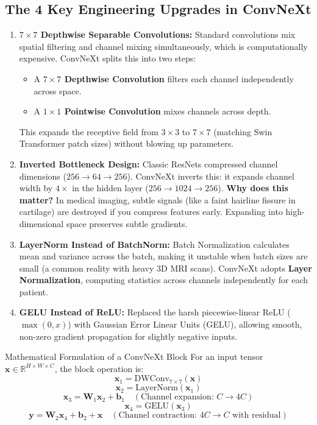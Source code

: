 \documentclass[11pt,a4paper]{article}
\begin{document}
\subsection{The 4 Key Engineering Upgrades in ConvNeXt}
\begin{enumerate}[leftmargin=*]
    \item \textbf{$7\times 7$ Depthwise Separable Convolutions:}
    Standard convolutions mix spatial filtering and channel mixing simultaneously, which is computationally expensive. ConvNeXt splits this into two steps:
    \begin{itemize}[noitemsep]
        \item A \textbf{$7\times 7$ Depthwise Convolution} filters each channel independently across space.
        \item A \textbf{$1\times 1$ Pointwise Convolution} mixes channels across depth.
    \end{itemize}
    This expands the receptive field from $3\times 3$ to $7\times 7$ (matching Swin Transformer patch sizes) without blowing up parameters.

    \item \textbf{Inverted Bottleneck Design:}
    Classic ResNets compressed channel dimensions ($256 \to 64 \to 256$). ConvNeXt inverts this: it expands channel width by $4\times$ in the hidden layer ($256 \to 1024 \to 256$). \textbf{Why does this matter?} In medical imaging, subtle signals (like a faint hairline fissure in cartilage) are destroyed if you compress features early. Expanding into high-dimensional space preserves subtle gradients.

    \item \textbf{LayerNorm Instead of BatchNorm:}
    Batch Normalization calculates mean and variance across the batch, making it unstable when batch sizes are small (a common reality with heavy 3D MRI scans). ConvNeXt adopts \textbf{Layer Normalization}, computing statistics across channels independently for each patient.

    \item \textbf{GELU Instead of ReLU:}
    Replaced the harsh piecewise-linear ReLU ($\max(0, x)$) with Gaussian Error Linear Units (GELU), allowing smooth, non-zero gradient propagation for slightly negative inputs.
\end{enumerate}

\begin{mechbox}{Mathematical Formulation of a ConvNeXt Block}
For an input tensor $\mathbf{x} \in \mathbb{R}^{H \times W \times C}$, the block operation is:
$$\mathbf{x}_1 = \text{DWConv}_{7\times 7}(\mathbf{x})$$
$$\mathbf{x}_2 = \text{LayerNorm}(\mathbf{x}_1)$$
$$\mathbf{x}_3 = \mathbf{W}_1 \mathbf{x}_2 + \mathbf{b}_1 \quad (\text{Channel expansion: } C \to 4C)$$
$$\mathbf{x}_4 = \text{GELU}(\mathbf{x}_3)$$
$$\mathbf{y} = \mathbf{W}_2 \mathbf{x}_4 + \mathbf{b}_2 + \mathbf{x} \quad (\text{Channel contraction: } 4C \to C \text{ with residual})$$
\end{mechbox}
\end{document}
